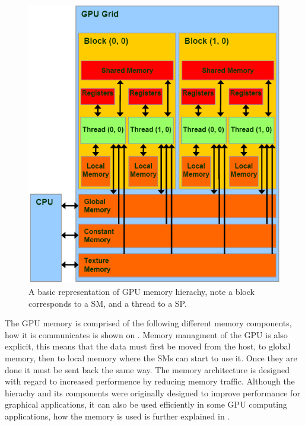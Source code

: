 \begin{figure}[h!]
\centering
 \includegraphics[width=1\textwidth]{figures/GPUMemory.png} %
\caption{A basic representation of GPU memory hierachy, note a block corresponds to a SM, and a thread to a SP.}\label{image:GPUMemory} 
\end{figure}
The GPU memory is comprised of the following different memory components, how it is communicates is shown on . 
Memory managment of the GPU is also explicit, this means that the data must first be moved from the host, to global memory, then to local memory where the SMs can start to use it. 
Once they are done it must be sent back the same way.
The memory architecture is designed with regard to increased performence by reducing memory traffic.
Although the hierachy and its components were originally designed to improve performance for graphical applications, it can also be used efficiently in some GPU computing applications, how the memory is used is further explained in . %

